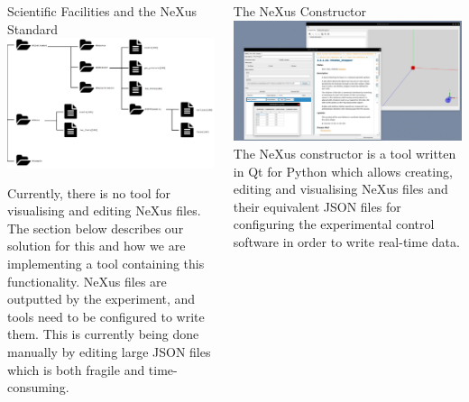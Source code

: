 \documentclass[usenames,dvipsnames]{beamer}
\begin{document}
\begin{frame}[t]
\begin{columns}[t]
\begin{column}{0.47\paperwidth}
\begin{custombox}{Scientific Facilities and the NeXus Standard}
\includegraphics[width=\linewidth]{nexusdiagram.png}

Currently, there is no tool for visualising and editing NeXus files. The section below describes our solution for this and how we are implementing a tool containing this functionality. NeXus files are outputted by the experiment, and tools need to be configured to write them. This is currently being done manually by editing large JSON files which is both fragile and time-consuming.
\end{custombox}



\end{column}   

\begin{column}{0.47\paperwidth}  

\begin{custombox}{The NeXus Constructor}
\includegraphics[width=\linewidth]{screenshot.png}
The NeXus constructor is a tool written in Qt for Python which allows creating, editing and visualising NeXus files and their equivalent JSON files for configuring the experimental control software in order to write real-time data. 
\end{custombox}


\end{column}
\end{columns}
\end{frame}
\end{document}

